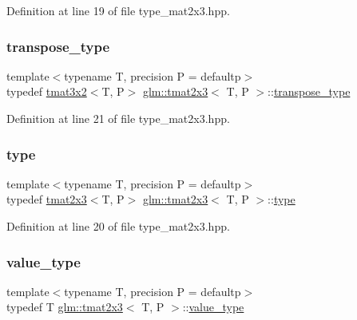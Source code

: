 Definition at line 19 of file type\+\_\+mat2x3.\+hpp.

\mbox{\label{structglm_1_1tmat2x3_adade07dec727cac2e2463d8c765f133d}} 
\subsubsection{\texorpdfstring{transpose\_type}{transpose\_type}}
{\footnotesize\ttfamily template$<$typename T, precision P = defaultp$>$ \\
typedef \mbox{\hyperlink{structglm_1_1tmat3x2}{tmat3x2}}$<$T, P$>$ \mbox{\hyperlink{structglm_1_1tmat2x3}{glm\+::tmat2x3}}$<$ T, P $>$\+::\mbox{\hyperlink{structglm_1_1tmat2x3_adade07dec727cac2e2463d8c765f133d}{transpose\+\_\+type}}}



Definition at line 21 of file type\+\_\+mat2x3.\+hpp.

\mbox{\label{structglm_1_1tmat2x3_af35f08ee62979a5e377b5f5262c57937}} 
\subsubsection{\texorpdfstring{type}{type}}
{\footnotesize\ttfamily template$<$typename T, precision P = defaultp$>$ \\
typedef \mbox{\hyperlink{structglm_1_1tmat2x3}{tmat2x3}}$<$T, P$>$ \mbox{\hyperlink{structglm_1_1tmat2x3}{glm\+::tmat2x3}}$<$ T, P $>$\+::\mbox{\hyperlink{structglm_1_1tmat2x3_af35f08ee62979a5e377b5f5262c57937}{type}}}



Definition at line 20 of file type\+\_\+mat2x3.\+hpp.

\mbox{\label{structglm_1_1tmat2x3_a73172253a573f98aa06474e043cc03af}} 
\subsubsection{\texorpdfstring{value\_type}{value\_type}}
{\footnotesize\ttfamily template$<$typename T, precision P = defaultp$>$ \\
typedef T \mbox{\hyperlink{structglm_1_1tmat2x3}{glm\+::tmat2x3}}$<$ T, P $>$\+::\mbox{\hyperlink{structglm_1_1tmat2x3_a73172253a573f98aa06474e043cc03af}{value\+\_\+type}}}



